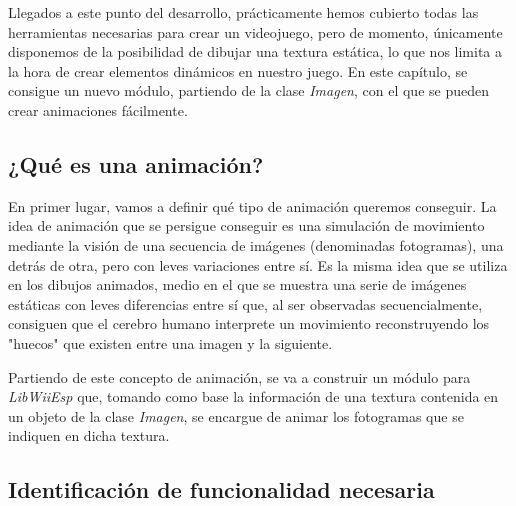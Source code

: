



Llegados a este punto del desarrollo, prácticamente hemos cubierto todas las herramientas necesarias para crear un videojuego, pero de momento, únicamente disponemos de la posibilidad de dibujar una textura estática, lo que nos limita a la hora de crear elementos dinámicos en nuestro juego. En este capítulo, se consigue un nuevo módulo, partiendo de la clase \emph{Imagen}, con el que se pueden crear animaciones fácilmente.

\subsection{¿Qué es una animación?}

En primer lugar, vamos a definir qué tipo de animación queremos conseguir. La idea de animación que se persigue conseguir es una simulación de movimiento mediante la visión de una secuencia de imágenes (denominadas fotogramas), una detrás de otra, pero con leves variaciones entre sí. Es la misma idea que se utiliza en los dibujos animados, medio en el que se muestra una serie de imágenes estáticas con leves diferencias entre sí que, al ser observadas secuencialmente, consiguen que el cerebro humano interprete un movimiento reconstruyendo los "huecos" que existen entre una imagen y la siguiente.\\


Partiendo de este concepto de animación, se va a construir un módulo para \emph{LibWiiEsp} que, tomando como base la información de una textura contenida en un objeto de la clase \emph{Imagen}, se encargue de animar los fotogramas que se indiquen en dicha textura.

\subsection{Identificación de funcionalidad necesaria}

